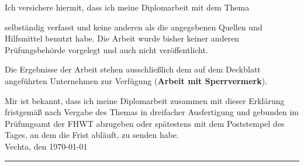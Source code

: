 Ich versichere hiermit, dass ich meine Diplomarbeit mit dem Thema
\begin{quote}
\textit{\titel} \textit{\untertitel}
\end{quote}
selbständig verfasst und keine anderen als die angegebenen Quellen und Hilfsmittel benutzt habe. Die Arbeit wurde bisher keiner anderen Prüfungsbehörde vorgelegt und auch nicht veröffentlicht.

Die Ergebnisse der Arbeit stehen ausschließlich dem auf dem Deckblatt angeführten Unternehmen zur Verfügung (\textbf{Arbeit mit Sperrvermerk}).

Mir ist bekannt, dass ich meine Diplomarbeit zusammen mit dieser Erklärung fristgemäß nach Vergabe des Themas in dreifacher Ausfertigung und gebunden im Prüfungsamt der FHWT abzugeben oder spätestens mit dem Poststempel des Tages, an dem die Frist abläuft, zu senden habe.\\[6ex]

Vechta, den \today


\rule[-0.2cm]{5cm}{0.5pt}

\textsc{\autor} 
